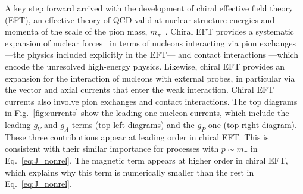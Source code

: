 A key step forward arrived with the development of chiral effective field theory (EFT), an effective theory of QCD valid at nuclear structure energies and momenta of the scale of the pion mass, $m_\pi$~\cite{Epelbaum:2008ga}. Chiral EFT provides a systematic expansion of nuclear forces~\cite{Machleidt:2011zz,Hammer:2012id} in terms of nucleons interacting via pion exchanges ---the physics included explicitly in the EFT--- and contact interactions  ---which encode the unresolved high-energy physics. Likewise, chiral EFT provides an expansion for the interaction of nucleons with external probes, in particular via the vector and axial currents that enter the weak interaction. Chiral EFT currents also involve pion exchanges and contact interactions. The top diagrams in Fig.~\ref{fig:currents} show the leading one-nucleon currents, which include the leading $g_V$ and $g_A$ terms (top left diagrams) and the $g_P$ one (top right diagram). These three contributions appear at leading order in chiral EFT. This is consistent with their similar importance for processes with $p\sim m_{\pi}$ in Eq.~\eqref{eq:J_nonrel}. The magnetic term appears at higher order in chiral EFT, which explains why this term is numerically smaller than the rest in Eq.~\eqref{eq:J_nonrel}.

